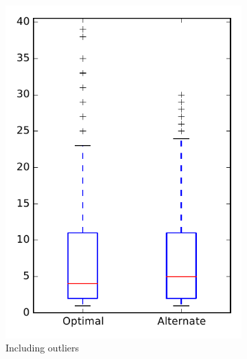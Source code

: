 
\begin{figure}
    \centering
    \begin{subfigure}{.4\textwidth}
        \centering
        \includegraphics[height=0.4\textheight]{figures/combo/dit_rq2_mahout}
        \caption{Including outliers}\label{fig:combo:dit:rq2:mahout_outlier}
    \end{subfigure}%
    \begin{subfigure}{.4\textwidth}
        \centering

\end{subfigure}
\end{figure}
